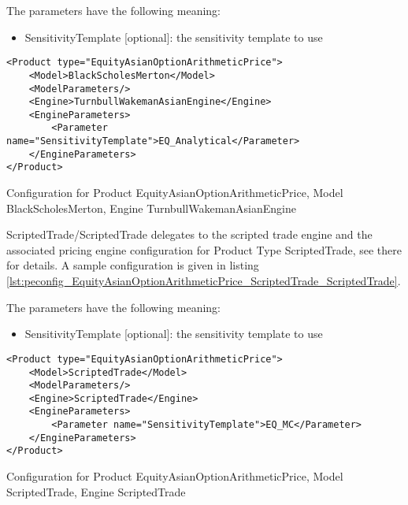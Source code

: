 The parameters have the following meaning:

\begin{itemize}
\item SensitivityTemplate [optional]: the sensitivity template to use 
\end{itemize}

\begin{longlisting}
\begin{verbatim}
<Product type="EquityAsianOptionArithmeticPrice">
    <Model>BlackScholesMerton</Model>
    <ModelParameters/>
    <Engine>TurnbullWakemanAsianEngine</Engine>
    <EngineParameters>
        <Parameter name="SensitivityTemplate">EQ_Analytical</Parameter>
    </EngineParameters>
</Product>
\end{verbatim}
\caption{Configuration for Product EquityAsianOptionArithmeticPrice, Model BlackScholesMerton, Engine TurnbullWakemanAsianEngine}
\label{lst:peconfig_EquityAsianOptionArithmeticPrice_BlackScholesMerton_TurnbullWakemanAsianEngine}
\end{longlisting}

ScriptedTrade/ScriptedTrade delegates to the scripted trade engine and the associated pricing engine configuration for
Product Type ScriptedTrade, see there for details. A sample configuration is given in listing
\ref{lst:peconfig_EquityAsianOptionArithmeticPrice_ScriptedTrade_ScriptedTrade}.

The parameters have the following meaning:

\begin{itemize}
\item SensitivityTemplate [optional]: the sensitivity template to use 
\end{itemize}

\begin{longlisting}
\begin{verbatim}
<Product type="EquityAsianOptionArithmeticPrice">
    <Model>ScriptedTrade</Model>
    <ModelParameters/>
    <Engine>ScriptedTrade</Engine>
    <EngineParameters>
        <Parameter name="SensitivityTemplate">EQ_MC</Parameter>
    </EngineParameters>
</Product>
\end{verbatim}
\caption{Configuration for Product EquityAsianOptionArithmeticPrice, Model ScriptedTrade, Engine ScriptedTrade}
\label{lst:peconfig_EquityAsianOptionArithmeticPrice_ScriptedTrade_ScriptedTrade}
\end{longlisting}


